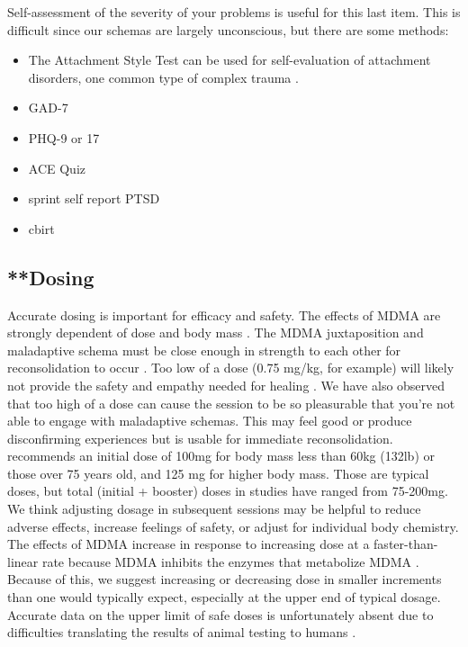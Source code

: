 \documentclass[12pt,letterpaper]{book}
\begin{document}
Self-assessment of the severity of your problems is useful for this last item. This is difficult since our schemas are largely unconscious, but there are some methods:
\begin{itemize}
    \item The Attachment Style Test can be used for self-evaluation of attachment disorders, one common type of complex trauma \cite{attachmentProject}.
    \item GAD-7
    \item PHQ-9 or 17
    \item ACE Quiz
    \item sprint self report PTSD
    \item cbirt
\end{itemize}
\subsection{**Dosing}
\label{sec:dosing}
Accurate dosing is important for efficacy and safety. The effects of MDMA are strongly dependent of dose and body mass \cite{studerusResponse}. The MDMA juxtaposition and maladaptive schema must be close enough in strength to each other for reconsolidation to occur \cite{eckerUnlocking}. Too low of a dose (0.75 mg/kg, for example) will likely not provide the safety and empathy needed for healing \cite{bediMDMALowDose}. We have also observed that too high of a dose can cause the session to be so pleasurable that you're not able to engage with maladaptive schemas. This may feel good or produce disconfirming experiences but is usable for immediate reconsolidation. \textcite{liechtiInteractions} recommends an initial dose of 100mg for body mass less than 60kg (132lb) or those over 75 years old, and 125 mg for higher body mass. Those are typical doses, but total (initial + booster) doses in studies have ranged from 75-200mg. We think adjusting dosage in subsequent sessions may be helpful to reduce adverse effects, increase feelings of safety, or adjust for individual body chemistry. The effects of MDMA increase in response to increasing dose at a faster-than-linear rate because MDMA inhibits the enzymes that metabolize MDMA \cite{de2000nonlinear}. Because of this, we suggest increasing or decreasing dose in smaller increments than one would typically expect, especially at the upper end of typical dosage. Accurate data on the upper limit of safe doses is unfortunately absent due to difficulties translating the results of animal testing to humans \cite{passieHistory}.
\end{document}
